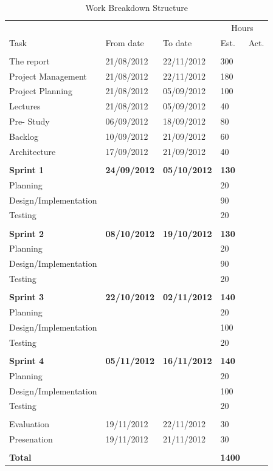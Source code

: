 \begin{table}
\caption{Work Breakdown Structure}
\centering
\begin{tabular}{ l l l l l }
\hline 
			&				&				&\multicolumn{2}{c}{Hours}		\\
 Task		& From date		&To date			&Est.			&Act.	                \\ 
\hline \\ [-2.0ex]
 The report     			&21/08/2012		&22/11/2012		&300		&         	 \\
 Project Management	&21/08/2012		&22/11/2012		&180		&		\\
 Project Planning		&21/08/2012		&05/09/2012		&100		&		\\
 Lectures				&21/08/2012		&05/09/2012		&40			&		\\	
 Pre- Study			&06/09/2012		&18/09/2012		&80			&		\\
 Backlog				&10/09/2012		&21/09/2012		&60			&		\\
 Architecture			&17/09/2012		&21/09/2012		&40			&		\\
\hline \\ [-2.0ex]
 \bf{Sprint 1}			&\bf{24/09/2012}	&\bf{05/10/2012}	&\bf{130}		&		\\
 Planning				&				&				&20			&		\\
 Design/Implementation	&				&				&90			&		\\
 Testing				&				&				&20			&		\\
\hline \\ [-2.0ex]
 \bf{Sprint 2}			&\bf{08/10/2012}	&\bf{19/10/2012}	&\bf{130}		&		\\
 Planning				&				&				&20			&		\\
 Design/Implementation	&				&				&90			&		\\
 Testing				&				&				&20			&		\\
\hline \\ [-2.0ex]
 \bf{Sprint 3}			&\bf{22/10/2012}	&\bf{02/11/2012}	&\bf{140}		&		\\
 Planning				&				&				&20			&		\\
 Design/Implementation	&				&				&100		&		\\
 Testing				&				&				&20			&		\\
\hline \\ [-2.0ex]
 \bf{Sprint 4}			&\bf{05/11/2012}	&\bf{16/11/2012}	&\bf{140}		&		\\
 Planning				&				&				&20			&		\\
 Design/Implementation	&				&				&100		&		\\
 Testing				&				&				&20			&		\\
\hline \\ [-2.0ex]
 Evaluation			&19/11/2012		&22/11/2012		&30			&		\\
 Presenation			&19/11/2012		&21/11/2012		&30			&		\\
\hline \\ [-2.0ex]
 \bf{Total}			&				&				&\bf{1400}	&		\\
\hline
\end{tabular}
\label{table:wbs}
\end{table}

